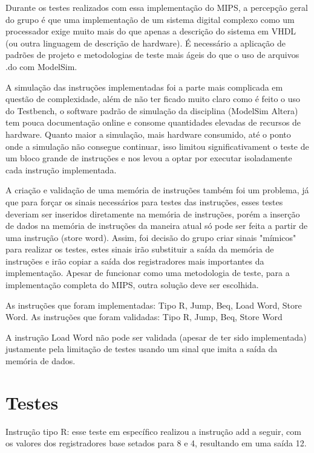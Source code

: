 \documentclass{article}
\begin{document}
    Durante os testes realizados com essa implementação do MIPS, a percepção geral do grupo é que 
    uma implementação de um sistema digital complexo como um processador exige muito mais do que apenas
    a descrição do sistema em VHDL (ou outra linguagem de descrição de hardware). É necessário a aplicação
    de padrões de projeto e metodologias de teste mais ágeis do que o uso de arquivos .do com ModelSim.

    A simulação das instruções implementadas foi a parte mais complicada em questão de complexidade, além
    de não ter ficado muito claro como é feito o uso do Testbench, o software padrão de simulação da
    disciplina (ModelSim Altera) tem pouca documentação online e consome quantidades elevadas de recursos
    de hardware. Quanto maior a simulação, mais hardware consumido, até o ponto onde a simulação não consegue
    continuar, isso limitou significativament o teste de um bloco grande de instruções e nos levou a optar
    por executar isoladamente cada instrução implementada.

    A criação e validação de uma memória de instruções também foi um problema, já que para forçar os 
    sinais necessários para testes das instruções, esses testes deveriam ser inseridos diretamente na
    memória de instruções, porém a inserção de dados na memória de instruções da maneira atual só pode
    ser feita a partir de uma instrução (store word). Assim, foi decisão do grupo criar sinais "mímicos"
    para realizar os testes, estes sinais irão substituir a saída da memória de instruções e irão copiar
    a saída dos registradores mais importantes da implementação. Apesar de funcionar como uma metodologia 
    de teste, para a implementação completa do MIPS, outra solução deve ser escolhida.

    As instruções que foram implementadas: Tipo R, Jump, Beq, Load Word, Store Word.
    As instruções que foram validadas: Tipo R, Jump, Beq, Store Word

    A instrução Load Word não pode ser validada (apesar de ter sido implementada) justamente pela limitação
    de testes usando um sinal que imita a saída da memória de dados.

    \section{Testes}

    Instrução tipo R: esse teste em específico realizou a instrução add a seguir, com os valores dos 
    registradores base setados para 8 e 4, resultando em uma saída 12.
\end{document}
